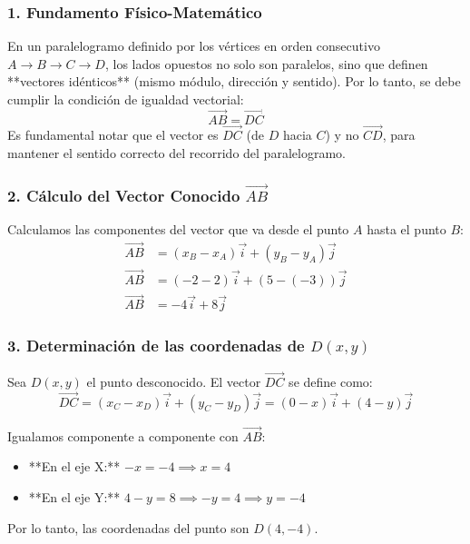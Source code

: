 \documentclass[12pt, a4paper]{article}
\begin{document}
\subsubsection*{1. Fundamento Físico-Matemático}
En un paralelogramo definido por los vértices en orden consecutivo $A \to B \to C \to D$, los lados opuestos no solo son paralelos, sino que definen **vectores idénticos** (mismo módulo, dirección y sentido). Por lo tanto, se debe cumplir la condición de igualdad vectorial:
\begin{equation*}
    \vec{AB} = \vec{DC}
\end{equation*}
Es fundamental notar que el vector es $\vec{DC}$ (de $D$ hacia $C$) y no $\vec{CD}$, para mantener el sentido correcto del recorrido del paralelogramo.

\subsubsection*{2. Cálculo del Vector Conocido $\vec{AB}$}
Calculamos las componentes del vector que va desde el punto $A$ hasta el punto $B$:
\begin{align*}
    \vec{AB} &= (x_B - x_A)\vec{i} + (y_B - y_A)\vec{j} \\
    \vec{AB} &= (-2 - 2)\vec{i} + (5 - (-3))\vec{j} \\
    \vec{AB} &= -4\vec{i} + 8\vec{j}
\end{align*}

\subsubsection*{3. Determinación de las coordenadas de $D(x, y)$}
Sea $D(x, y)$ el punto desconocido. El vector $\vec{DC}$ se define como:
\begin{equation*}
    \vec{DC} = (x_C - x_D)\vec{i} + (y_C - y_D)\vec{j} = (0 - x)\vec{i} + (4 - y)\vec{j}
\end{equation*}

Igualamos componente a componente con $\vec{AB}$:
\begin{itemize}
    \item **En el eje X:** $-x = -4 \implies x = 4$
    \item **En el eje Y:** $4 - y = 8 \implies -y = 4 \implies y = -4$
\end{itemize}

Por lo tanto, las coordenadas del punto son $D(4, -4)$.
\end{document}

